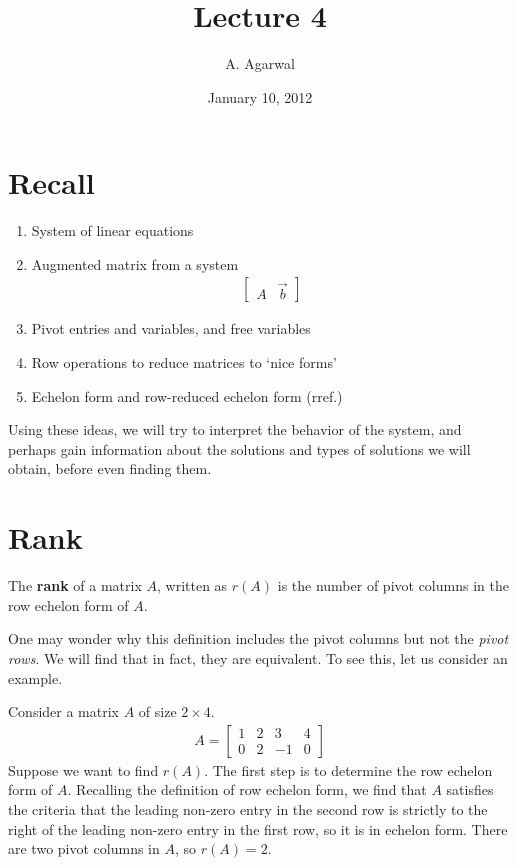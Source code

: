 \documentclass[11pt]{article}
\title{Lecture 4}
\author{A. Agarwal}
\date{January 10, 2012}
\newcommand{\keyphrase}{\textbf}
\begin{document}

\section*{Recall}

\begin{enumerate}
\item{
System of linear equations
}
\item{
Augmented matrix from a system
\begin{align*}
\left[\begin{matrix}
A & \vec{b}
\end{matrix}\right]
\end{align*}
}
\item{
Pivot entries and variables, and free variables
}
\item{
Row operations to reduce matrices to `nice forms'
}
\item{
Echelon form and row-reduced echelon form (rref.)
}
\end{enumerate}

Using these ideas, we will try to interpret the behavior of the system, and perhaps gain information about the solutions and types of solutions we will obtain, before even finding them.

\section*{Rank}

The \keyphrase{rank} of a matrix $A$, written as $r(A)$ is the number of pivot columns in the row echelon form of $A$.

One may wonder why this definition includes the pivot columns but not the \emph{pivot rows}. We will find that in fact, they are equivalent. To see this, let us consider an example.

Consider a matrix $A$ of size $2 \times 4$.
\begin{align*}
A =
\left[
\begin{matrix}
1 & 2 & 3 & 4
\\
0 & 2 & -1 & 0
\end{matrix}
\right]
\end{align*}
Suppose we want to find $r(A)$. The first step is to determine the row echelon form of $A$. Recalling the definition of row echelon form, we find that $A$ satisfies the criteria that the leading non-zero entry in the second row is strictly to the right of the leading non-zero entry in the first row, so it is in echelon form. There are two pivot columns in $A$, so $r(A) = 2$.
\end{document}
